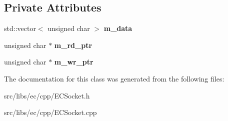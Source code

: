 \subsection*{Private Attributes}
\begin{DoxyCompactItemize}
\item 
std::vector$<$ unsigned char $>$ {\bfseries m\_\-data}\label{classCQueuedData_a03fa9ec6d9776966a37fc5e45afa227b}

\item 
unsigned char $\ast$ {\bfseries m\_\-rd\_\-ptr}\label{classCQueuedData_a7b037e049fff90276cffd9a8af79a5e2}

\item 
unsigned char $\ast$ {\bfseries m\_\-wr\_\-ptr}\label{classCQueuedData_a7473a159b16c14dd6abe7897e1772752}

\end{DoxyCompactItemize}


The documentation for this class was generated from the following files:\begin{DoxyCompactItemize}
\item 
src/libs/ec/cpp/ECSocket.h\item 
src/libs/ec/cpp/ECSocket.cpp\end{DoxyCompactItemize}
